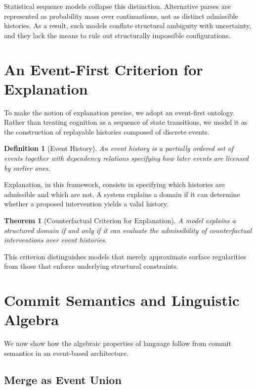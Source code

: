 \documentclass[11pt]{article}
\newtheorem{definition}{Definition}
\newtheorem{theorem}{Theorem}
\begin{document}
Statistical sequence models collapse this distinction. Alternative parses are represented as probability mass over continuations, not as distinct admissible histories. As a result, such models conflate structural ambiguity with uncertainty, and they lack the means to rule out structurally impossible configurations.

\section{An Event-First Criterion for Explanation}

To make the notion of explanation precise, we adopt an event-first ontology. Rather than treating cognition as a sequence of state transitions, we model it as the construction of replayable histories composed of discrete events.

\begin{definition}[Event History]
An event history is a partially ordered set of events together with dependency relations specifying how later events are licensed by earlier ones.
\end{definition}

Explanation, in this framework, consists in specifying which histories are admissible and which are not. A system explains a domain if it can determine whether a proposed intervention yields a valid history.

\begin{theorem}[Counterfactual Criterion for Explanation]
A model explains a structured domain if and only if it can evaluate the admissibility of counterfactual interventions over event histories.
\end{theorem}

This criterion distinguishes models that merely approximate surface regularities from those that enforce underlying structural constraints.

\section{Commit Semantics and Linguistic Algebra}

We now show how the algebraic properties of language follow from commit semantics in an event-based architecture.

\subsection{Merge as Event Union}
\end{document}

